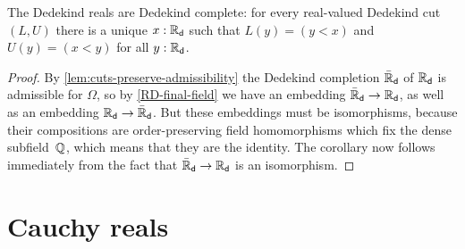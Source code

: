 \begin{cor} \label{RD-dedekind-complete}
  The Dedekind reals are Dedekind complete: for every real-valued Dedekind cut $(L, U)$
  there is a unique $x : \mathbb{R}_\mathsf{d}$ such that $L(y) = (y < x)$ and $U(y) = (x < y)$ for all $y :
  \mathbb{R}_\mathsf{d}$.
\end{cor}

\begin{proof}
  By \cref{lem:cuts-preserve-admissibility} the Dedekind completion $\bar{\mathbb{R}}_\mathsf{d}$ of $\mathbb{R}_\mathsf{d}$
  is admissible for $\Omega$, so by \cref{RD-final-field} we have an embedding $\bar{\mathbb{R}}_\mathsf{d}
  \to \mathbb{R}_\mathsf{d}$, as well as an embedding $\mathbb{R}_\mathsf{d} \to \bar{\mathbb{R}}_\mathsf{d}$. But these embeddings must be
  isomorphisms, because their compositions are order-preserving field homomorphisms which
  fix the dense subfield~$\mathbb{Q}$, which means that they are the identity. The corollary now
  follows immediately from the fact that $\bar{\mathbb{R}}_\mathsf{d} \to \mathbb{R}_\mathsf{d}$ is an isomorphism.
\end{proof}

%

\section{Cauchy reals}
\label{sec:cauchy-reals}

